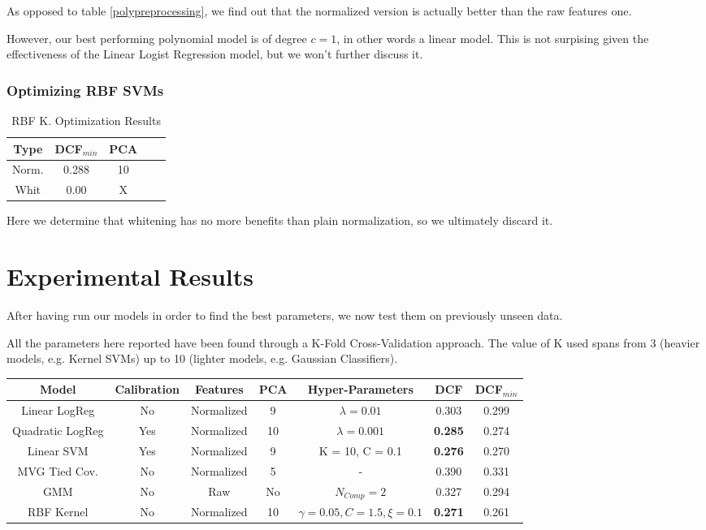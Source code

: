 \documentclass[12pt, twocolumn]{article}
\begin{document}
As opposed to table \ref{polypreprocessing}, we find out that the normalized version is actually better than the raw features one.

However, our best performing polynomial model is of degree $ c = 1 $, in other words a linear model.
This is not surpising given the effectiveness of the Linear Logist Regression model, but we won't further discuss it.

\subsubsection{Optimizing RBF SVMs}

\begin{table}[H] 
    \centering
    \begin{tabular}{||c|c|c|c|c||}
        \hline
        Type & DCF$_{min}$ & PCA \\
        \hline
        \hline
        Norm. & 0.288 & 10 \\
        Whit & 0.00 & X \\
        \hline
    \end{tabular}
    \caption{RBF K. Optimization Results}
    \label{tab:rbfoptimization}
\end{table}

Here we determine that whitening has no more benefits than plain normalization, so we ultimately discard it.

\section{Experimental Results}

After having run our models in order to find the best parameters, we now test them on previously unseen data.

All the parameters here reported have been found through a K-Fold Cross-Validation approach.
The value of K used spans from 3 (heavier models, e.g. Kernel SVMs) up to 10 (lighter models, e.g. Gaussian Classifiers).

\begin{table}[t] 
    \centering
    \begin{tabular}{||c|c|c|c|c|c|c||}
        \hline 
        Model & Calibration & Features & PCA & Hyper-Parameters & DCF & DCF$_{min}$ \\
        \hline
        Linear LogReg & No & Normalized & 9 & $\lambda = 0.01$ & 0.303 & 0.299 \\
        Quadratic LogReg & Yes & Normalized & 10 & $\lambda = 0.001$ & {\bf 0.285} & 0.274 \\
        Linear SVM & Yes & Normalized & 9 & K = 10, C = 0.1 & {\bf 0.276} & 0.270 \\
        MVG Tied Cov. & No & Normalized & 5 & - & 0.390 & 0.331 \\
        GMM & No & Raw & No & $N_{Comp} = 2 $ & 0.327 & 0.294 \\ 
        RBF Kernel & No & Normalized & 10 & $\gamma = 0.05, C = 1.5, \xi = 0.1$  & {\bf 0.271} & 0.261 \\
        \hline
    \end{tabular}
\end{table}
\end{document}
